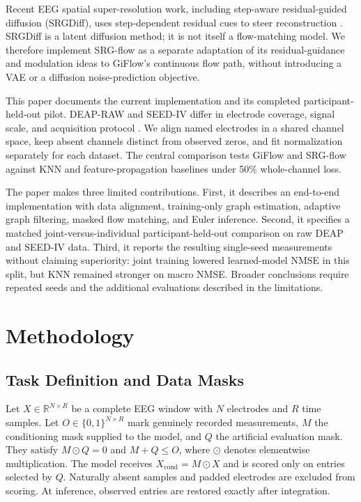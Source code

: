 \documentclass{article}
\begin{document}
Recent EEG spatial super-resolution work, including step-aware
residual-guided diffusion (SRGDiff), uses step-dependent residual cues to
steer reconstruction \cite{liu2026srgdiff}. SRGDiff is a latent diffusion
method; it is not itself a flow-matching model. We therefore implement
SRG-flow as a separate adaptation of its residual-guidance and modulation
ideas to GiFlow's continuous flow path, without introducing a VAE or a
diffusion noise-prediction objective.

This paper documents the current implementation and its completed
participant-held-out pilot. DEAP-RAW and SEED-IV differ in electrode
coverage, signal scale, and acquisition protocol
\cite{koelstra2012deap,zheng2019emotionmeter}. We align named electrodes in
a shared channel space, keep absent channels distinct from observed zeros,
and fit normalization separately for each dataset. The central comparison
tests GiFlow and SRG-flow against KNN and feature-propagation baselines under
50\% whole-channel loss.

The paper makes three limited contributions. First, it describes an
end-to-end implementation with data alignment, training-only graph
estimation, adaptive graph filtering, masked flow matching, and Euler
inference. Second, it specifies a matched joint-versus-individual
participant-held-out comparison on raw DEAP and SEED-IV data. Third, it
reports the resulting single-seed measurements without claiming superiority:
joint training lowered learned-model NMSE in this split, but KNN remained
stronger on macro NMSE. Broader conclusions require repeated seeds and the
additional evaluations described in the limitations.

\section{Methodology}

\subsection{Task Definition and Data Masks}

Let $X \in \mathbb{R}^{N \times R}$ be a complete EEG window with $N$
electrodes and $R$ time samples. Let $O \in \{0,1\}^{N \times R}$ mark
genuinely recorded measurements, $M$ the conditioning mask supplied to the
model, and $Q$ the artificial evaluation mask. They satisfy
$M \odot Q=0$ and $M+Q\leq O$, where $\odot$ denotes elementwise
multiplication. The model receives
$X_{\mathrm{cond}}=M\odot X$ and is scored only on entries selected by $Q$.
Naturally absent samples and padded electrodes are excluded from scoring.
At inference, observed entries are restored exactly after integration.
\end{document}
